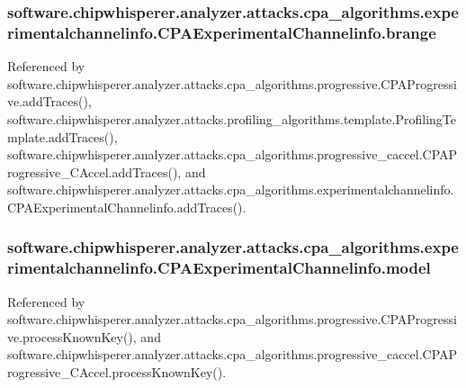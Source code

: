 \subsubsection[{brange}]{\setlength{\rightskip}{0pt plus 5cm}software.\+chipwhisperer.\+analyzer.\+attacks.\+cpa\+\_\+algorithms.\+experimentalchannelinfo.\+C\+P\+A\+Experimental\+Channelinfo.\+brange}\label{classsoftware_1_1chipwhisperer_1_1analyzer_1_1attacks_1_1cpa__algorithms_1_1experimentalchannelif6c161da2587ecb2ba5aefd93c43622a_a6ef4a4594c498869ef09bd4163a64d48}


Referenced by software.\+chipwhisperer.\+analyzer.\+attacks.\+cpa\+\_\+algorithms.\+progressive.\+C\+P\+A\+Progressive.\+add\+Traces(), software.\+chipwhisperer.\+analyzer.\+attacks.\+profiling\+\_\+algorithms.\+template.\+Profiling\+Template.\+add\+Traces(), software.\+chipwhisperer.\+analyzer.\+attacks.\+cpa\+\_\+algorithms.\+progressive\+\_\+caccel.\+C\+P\+A\+Progressive\+\_\+\+C\+Accel.\+add\+Traces(), and software.\+chipwhisperer.\+analyzer.\+attacks.\+cpa\+\_\+algorithms.\+experimentalchannelinfo.\+C\+P\+A\+Experimental\+Channelinfo.\+add\+Traces().

\hypertarget{classsoftware_1_1chipwhisperer_1_1analyzer_1_1attacks_1_1cpa__algorithms_1_1experimentalchannelif6c161da2587ecb2ba5aefd93c43622a_a3e8e62080cfc027bfeaf640c3197024e}{}
\subsubsection[{model}]{\setlength{\rightskip}{0pt plus 5cm}software.\+chipwhisperer.\+analyzer.\+attacks.\+cpa\+\_\+algorithms.\+experimentalchannelinfo.\+C\+P\+A\+Experimental\+Channelinfo.\+model}\label{classsoftware_1_1chipwhisperer_1_1analyzer_1_1attacks_1_1cpa__algorithms_1_1experimentalchannelif6c161da2587ecb2ba5aefd93c43622a_a3e8e62080cfc027bfeaf640c3197024e}


Referenced by software.\+chipwhisperer.\+analyzer.\+attacks.\+cpa\+\_\+algorithms.\+progressive.\+C\+P\+A\+Progressive.\+process\+Known\+Key(), and software.\+chipwhisperer.\+analyzer.\+attacks.\+cpa\+\_\+algorithms.\+progressive\+\_\+caccel.\+C\+P\+A\+Progressive\+\_\+\+C\+Accel.\+process\+Known\+Key().

